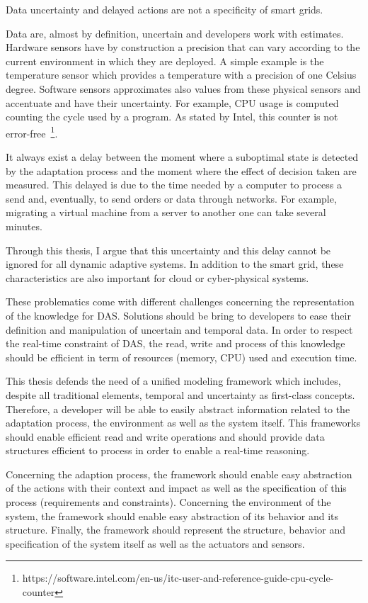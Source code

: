 \bigskip
Data uncertainty and delayed actions are not a specificity of smart grids.

Data are, almost by definition, uncertain and developers work with estimates.
Hardware sensors have by construction a precision that can vary according to the current environment in which they are deployed.
A simple example is the temperature sensor which provides a temperature with a precision of one Celsius degree.
Software sensors approximates also values from these physical sensors and accentuate and have their uncertainty.
For example, CPU usage is computed counting the cycle used by a program.
As stated by Intel, this counter is not error-free~\footnote{https://software.intel.com/en-us/itc-user-and-reference-guide-cpu-cycle-counter}.

It always exist a delay between the moment where a suboptimal state is detected by the adaptation process and the moment where the effect of decision taken are measured.
This delayed is due to the time needed by a computer to process a send and, eventually, to send orders or data through networks.
For example, migrating a virtual machine from a server to another one can take several minutes.

Through this thesis, I argue that this uncertainty and this delay cannot be ignored for all dynamic adaptive systems.
In addition to the smart grid, these characteristics are also important for cloud or cyber-physical systems.

\bigskip
These problematics come with different challenges concerning the representation of the knowledge for DAS.
Solutions should be bring to developers to ease their definition and manipulation of uncertain and temporal data.
In order to respect the real-time constraint of DAS, the read, write and process of this knowledge should be efficient in term of resources (memory, CPU) used and execution time.

\bigskip
This thesis defends the need of a unified modeling framework which includes, despite all traditional elements, temporal and uncertainty as first-class concepts.
Therefore, a developer will be able to easily abstract information related to the adaptation process, the environment as well as the system itself.
This frameworks should enable efficient read and write operations and should provide data structures efficient to process in order to enable a real-time reasoning.

Concerning the adaption process, the framework should enable easy abstraction of the actions with their context and impact as well as the specification of this process (requirements and constraints).
Concerning the environment of the system, the framework should enable easy abstraction of its behavior and its structure.
Finally, the framework should represent the structure, behavior and specification of the system itself as well as the actuators and sensors.

